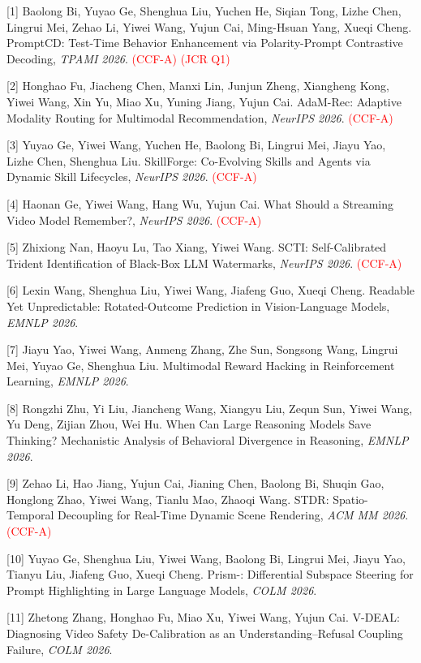 [1] Baolong Bi, Yuyao Ge, Shenghua Liu, Yuchen He, Siqian Tong, Lizhe Chen, Lingrui Mei, Zehao Li, Yiwei Wang, Yujun Cai, Ming-Hsuan Yang, Xueqi Cheng. PromptCD: Test-Time Behavior Enhancement via Polarity-Prompt Contrastive Decoding, \textit{TPAMI 2026}. \textcolor{red}{(CCF-A)} \textcolor{red}{(JCR Q1)}

[2] Honghao Fu, Jiacheng Chen, Manxi Lin, Junjun Zheng, Xiangheng Kong, Yiwei Wang, Xin Yu, Miao Xu, Yuning Jiang, Yujun Cai. AdaM-Rec: Adaptive Modality Routing for Multimodal Recommendation, \textit{NeurIPS 2026}. \textcolor{red}{(CCF-A)}

[3] Yuyao Ge, Yiwei Wang, Yuchen He, Baolong Bi, Lingrui Mei, Jiayu Yao, Lizhe Chen, Shenghua Liu. SkillForge: Co-Evolving Skills and Agents via Dynamic Skill Lifecycles, \textit{NeurIPS 2026}. \textcolor{red}{(CCF-A)}

[4] Haonan Ge, Yiwei Wang, Hang Wu, Yujun Cai. What Should a Streaming Video Model Remember?, \textit{NeurIPS 2026}. \textcolor{red}{(CCF-A)}

[5] Zhixiong Nan, Haoyu Lu, Tao Xiang, Yiwei Wang. SCTI: Self-Calibrated Trident Identification of Black-Box LLM Watermarks, \textit{NeurIPS 2026}. \textcolor{red}{(CCF-A)}

[6] Lexin Wang, Shenghua Liu, Yiwei Wang, Jiafeng Guo, Xueqi Cheng. Readable Yet Unpredictable: Rotated-Outcome Prediction in Vision-Language Models, \textit{EMNLP 2026}.

[7] Jiayu Yao, Yiwei Wang, Anmeng Zhang, Zhe Sun, Songsong Wang, Lingrui Mei, Yuyao Ge, Shenghua Liu. Multimodal Reward Hacking in Reinforcement Learning, \textit{EMNLP 2026}.

[8] Rongzhi Zhu, Yi Liu, Jiancheng Wang, Xiangyu Liu, Zequn Sun, Yiwei Wang, Yu Deng, Zijian Zhou, Wei Hu. When Can Large Reasoning Models Save Thinking? Mechanistic Analysis of Behavioral Divergence in Reasoning, \textit{EMNLP 2026}.

[9] Zehao Li, Hao Jiang, Yujun Cai, Jianing Chen, Baolong Bi, Shuqin Gao, Honglong Zhao, Yiwei Wang, Tianlu Mao, Zhaoqi Wang. {STDR}: Spatio-Temporal Decoupling for Real-Time Dynamic Scene Rendering, \textit{ACM MM 2026}. \textcolor{red}{(CCF-A)}

[10] Yuyao Ge, Shenghua Liu, Yiwei Wang, Baolong Bi, Lingrui Mei, Jiayu Yao, Tianyu Liu, Jiafeng Guo, Xueqi Cheng. Prism-: Differential Subspace Steering for Prompt Highlighting in Large Language Models, \textit{COLM 2026}.

[11] Zhetong Zhang, Honghao Fu, Miao Xu, Yiwei Wang, Yujun Cai. V-DEAL: Diagnosing Video Safety De-Calibration as an Understanding--Refusal Coupling Failure, \textit{COLM 2026}.

